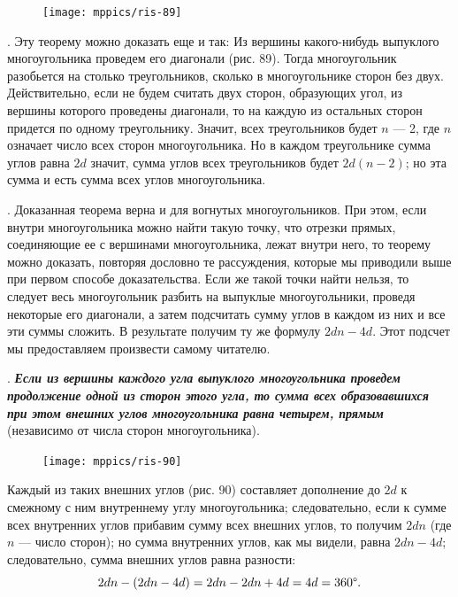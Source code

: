 \documentclass[oneside]{book}
\begin{document}
\begin{figure}
\centering
\texttt{[image: mppics/ris-89]}
\caption{}
\end{figure}

\mbox{.}
Эту теорему можно доказать еще и так:
Из вершины какого-нибудь выпуклого многоугольника проведем его диагонали (рис. 89).
Тогда многоугольник разобьется на столько треугольников, сколько в многоугольнике сторон без двух.
Действительно, если не будем считать двух сторон, образующих угол, из вершины которого проведены диагонали, то на каждую из остальных сторон придется по одному треугольнику.
Значит, всех треугольников будет $n$ — 2, где $n$ означает число всех сторон многоугольника.
Но в каждом треугольнике сумма углов равна $2d$ значит, сумма углов всех треугольников будет $2d(n-2)$;
но эта сумма и есть сумма всех углов многоугольника.

.
Доказанная теорема верна и для вогнутых многоугольников.
При этом, если внутри многоугольника можно найти такую точку, что отрезки прямых, соединяющие ее с вершинами многоугольника, лежат внутри него, то теорему можно доказать, повторяя дословно те рассуждения, которые мы приводили выше при первом способе доказательства.
Если же такой точки найти нельзя, то следует весь многоугольник разбить на выпуклые многоугольники, проведя некоторые его диагонали, а затем подсчитать сумму углов в каждом из них и все эти суммы сложить.
В результате получим ту же формулу $2dn - 4d$.
Этот подсчет мы предоставляем произвести самому читателю. %

.
\textbf{\emph{Если из вершины каждого угла выпуклого многоугольника проведем продолжение одной из сторон этого угла, то сумма всех образовавшихся при этом внешних углов многоугольника равна четырем, прямым}} (независимо от числа сторон многоугольника).

\begin{figure}
\centering
\texttt{[image: mppics/ris-90]}
\caption{}
\end{figure}

Каждый из таких внешних углов (рис. 90) составляет дополнение до $2d$ к смежному с ним внутреннему углу многоугольника;
следовательно, если к сумме всех внутренних углов прибавим сумму всех внешних углов, то получим $2dn$ (где $n$ — число сторон);
но сумма внутренних углов, как мы видели, равна $2dn -4d$;
следовательно, сумма внешних углов равна разности:
\[2dn-(2dn-4d)=2dn-2dn+4d=4d=360\degree.\]
\end{document}
